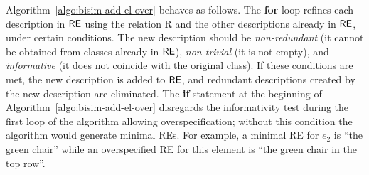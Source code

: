 Algorithm~\ref{algo:bisim-add-el-over} behaves as follows. The \textbf{for} loop refines each description in $\textsf{RE}$ using the relation R and the other descriptions already in $\textsf{RE}$, under certain conditions. The new description should be \emph{non-redundant} (it cannot be obtained from classes already in $\textsf{RE}$), \emph{non-trivial} (it is not empty), and \emph{informative} (it does not coincide with the original class).  If these conditions are met, the new description is added to $\textsf{RE}$, and redundant descriptions created by the new description are eliminated. The \textbf{if} statement at the beginning of Algorithm~\ref{algo:bisim-add-el-over} disregards the informativity test during the first loop of the algorithm allowing overspecification; without this condition the algorithm would generate minimal REs. For example, a minimal RE for $e_2$ is ``the green chair'' while an overspecified RE for this element is ``the green chair in the top row''.     

